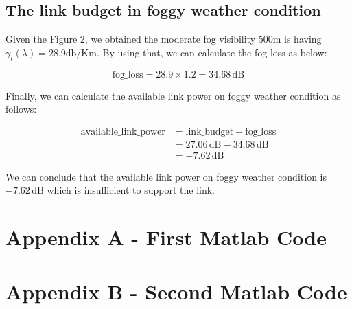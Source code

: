 \documentclass[12pt]{article}
\begin{document}
\subsection{The link budget in foggy weather condition}

Given the Figure 2, we obtained the moderate fog visibility 500m is having $\gamma_{t}(\lambda) = 28.9 \text{db/Km}$. By using that, we can calculate the fog loss as below:

\begin{equation}
    \text{fog\_loss} = 28.9 \times 1.2 = 34.68\, \text{dB}
\end{equation}

Finally, we can calculate the available link power on foggy weather condition as follows:

    \begin{equation}
        \begin{split}
            \text{available\_link\_power} &= \text{link\_budget} - \text{fog\_loss} \\
            &= 27.06\, \text{dB} - 34.68\, \text{dB} \\
            &= -7.62\, \text{dB}
        \end{split}
    \end{equation}

We can conclude that the available link power on foggy weather condition is $-7.62\, \text{dB}$ which is insufficient to support the link.


\newpage
\appendix

\section*{Appendix A - First Matlab Code}


\section*{Appendix B - Second Matlab Code}

        
\end{document}
